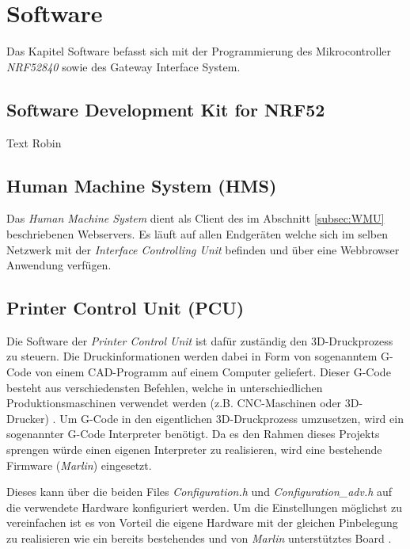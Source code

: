 \clearpage
\section{Software}\label{sec:Software}
Das Kapitel Software befasst sich mit der Programmierung des Mikrocontroller \textit{NRF52840} sowie des Gateway Interface System.

\subsection{Software Development Kit for NRF52}\label{subsec:SDK}
Text Robin



\subsection{Human Machine System (HMS)}\label{subsec:HMS_SW}
Das \textit{Human Machine System} dient als Client des im Abschnitt \ref{subsec:WMU} beschriebenen Webservers. Es läuft auf allen Endgeräten welche sich im selben Netzwerk mit der \textit{Interface Controlling Unit} befinden und über eine Webbrowser Anwendung verfügen. 









\subsection{Printer Control Unit (PCU)}\label{subsec:PCU}
Die Software der \textit{Printer Control Unit} ist dafür zuständig den 3D-Druckprozess zu steuern. Die Druckinformationen werden dabei in Form von sogenanntem G-Code von einem CAD-Programm auf einem Computer geliefert. Dieser G-Code besteht aus verschiedensten Befehlen, welche in unterschiedlichen Produktionsmaschinen verwendet werden (z.B. CNC-Maschinen oder 3D-Drucker) \cite{G_Code_Tutorial}. Um G-Code in den eigentlichen 3D-Druckprozess umzusetzen, wird ein sogenannter G-Code Interpreter benötigt. Da es den Rahmen dieses Projekts sprengen würde einen eigenen Interpreter zu realisieren, wird eine bestehende Firmware (\textit{Marlin}) eingesetzt. 

Dieses kann über die beiden Files \textit{Configuration.h} und \textit{Configuration\_adv.h} auf die verwendete Hardware konfiguriert werden. Um die Einstellungen möglichst zu vereinfachen ist es von Vorteil die eigene Hardware mit der gleichen Pinbelegung zu realisieren wie ein bereits bestehendes und von \textit{Marlin} unterstütztes Board \cite{Marlin_Configuration}. 





